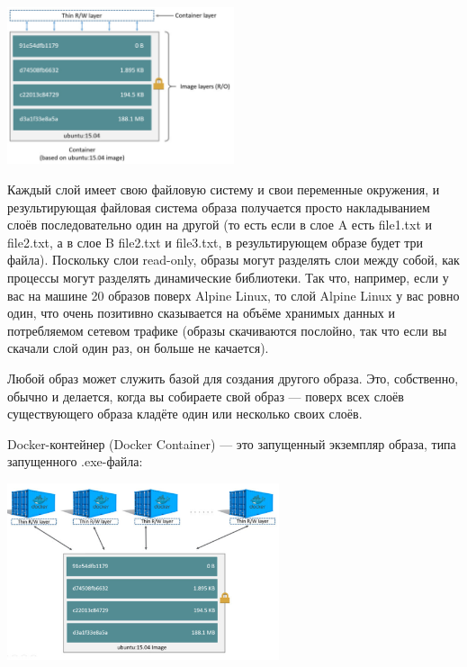 \documentclass{../../text-style}
\begin{document}
\begin{center}
    \includegraphics[width=0.5\textwidth]{dockerLayers.png}
\end{center}

Каждый слой имеет свою файловую систему и свои переменные окружения, и результирующая файловая система образа получается просто накладыванием слоёв последовательно один на другой (то есть если в слое A есть file1.txt и file2.txt, а в слое B file2.txt и file3.txt, в результирующем образе будет три файла). Поскольку слои read-only, образы могут разделять слои между собой, как процессы могут разделять динамические библиотеки. Так что, например, если у вас на машине 20 образов поверх Alpine Linux, то слой Alpine Linux у вас ровно один, что очень позитивно сказывается на объёме хранимых данных и потребляемом сетевом трафике (образы скачиваются послойно, так что если вы скачали слой один раз, он больше не качается).

Любой образ может служить базой для создания другого образа. Это, собственно, обычно и делается, когда вы собираете свой образ --- поверх всех слоёв существующего образа кладёте один или несколько своих слоёв.

Docker-контейнер (Docker Container) --- это запущенный экземпляр образа, типа запущенного .exe-файла:

\begin{center}
    \includegraphics[width=0.6\textwidth]{dockerContainer.png}
\end{center}
\end{document}
